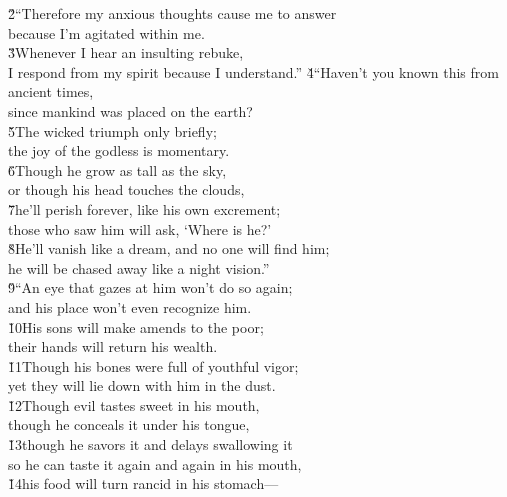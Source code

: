 \begin{poetry}
\poeml \v{2}``Therefore my anxious thoughts cause me to answer \\
\poemll    because I'm agitated within me. \\
\poeml \v{3}Whenever I hear an insulting rebuke, \\
\poemll    I respond from my spirit because I understand.''
\poeml \v{4}``Haven't you known this from ancient times, \\
\poemll    since mankind was placed on the earth? \\
\poeml \v{5}The wicked triumph only briefly; \\
\poemll    the joy of the godless is momentary. \\
\poeml \v{6}Though he grow as tall as the sky, \\
\poemll    or though his head touches the clouds, \\
\poeml \v{7}he'll perish forever, like his own excrement; \\
\poemll    those who saw him will ask, `Where is he?' \\
\poeml \v{8}He'll vanish like a dream, and no one will find him; \\
\poemll    he will be chased away like a night vision.'' \\
\poeml \v{9}``An eye that gazes at him won't do so again; \\
\poemll    and his place won't even recognize him. \\
\poeml \v{10}His sons will make amends to the poor; \\
\poemll    their hands will return his wealth. \\
\poeml \v{11}Though his bones were full of youthful vigor; \\
\poemll    yet they will lie down with him in the dust. \\
\poeml \v{12}Though evil tastes sweet in his mouth, \\
\poemll    though he conceals it under his tongue, \\
\poeml \v{13}though he savors it and delays swallowing it \\
\poemll    so he can taste it again and again in his mouth, \\
\poeml \v{14}his food will turn rancid in his stomach--- \\

\end{poetry}
